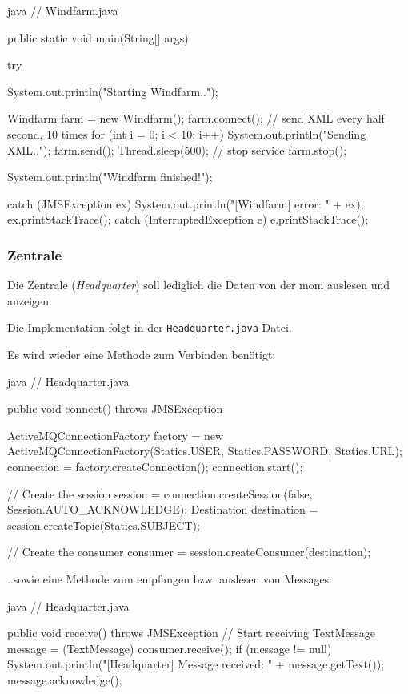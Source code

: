 \begin{code}{java}
// Windfarm.java

public static void main(String[] args) {
    try {
        System.out.println("Starting Windfarm..");

        Windfarm farm = new Windfarm();
        farm.connect();
        // send XML every half second, 10 times
        for (int i = 0; i < 10; i++) {
            System.out.println("Sending XML..");
            farm.send();
            Thread.sleep(500);
        }
        // stop service
        farm.stop();

        System.out.println("Windfarm finished!");
    } catch (JMSException ex) {
        System.out.println("[Windfarm] error: " + ex);
        ex.printStackTrace();
    } catch (InterruptedException e) {
        e.printStackTrace();
    }
}
\end{code}

\clearpage
\subsubsection{Zentrale}
\label{sec:headquarters}

Die Zentrale (\textit{Headquarter}) soll lediglich die Daten von der \gls{mom} auslesen und anzeigen.

Die Implementation folgt in der \texttt{Headquarter.java} Datei.

Es wird wieder eine Methode zum Verbinden benötigt:

\begin{code}{java}
// Headquarter.java

public void connect() throws JMSException {
    ActiveMQConnectionFactory factory = new ActiveMQConnectionFactory(Statics.USER, Statics.PASSWORD, Statics.URL);
    connection = factory.createConnection();
    connection.start();

    // Create the session
    session = connection.createSession(false, Session.AUTO_ACKNOWLEDGE);
    Destination destination = session.createTopic(Statics.SUBJECT);

    // Create the consumer
    consumer = session.createConsumer(destination);
}
\end{code}

..sowie eine Methode zum empfangen bzw. auslesen von Messages:

\begin{code}{java}
// Headquarter.java

public void receive() throws JMSException {
    // Start receiving
    TextMessage message = (TextMessage) consumer.receive();
    if (message != null) {
        System.out.println("[Headquarter] Message received: " + message.getText());
        message.acknowledge();
    }
}
\end{code}

